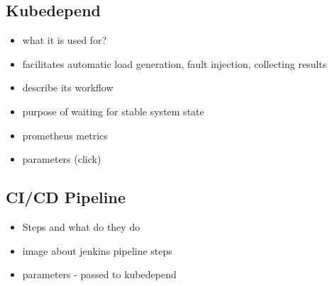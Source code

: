 \subsection{Kubedepend}

\begin{itemize}
	\item what it is used for?
	\item facilitates automatic load generation, fault injection, collecting results
	\item describe its workflow
	\item purpose of waiting for stable system state
	\item prometheus metrics
	\item parameters (click)
\end{itemize}

\subsection{CI/CD Pipeline} \label{cicd}

\begin{itemize}
	\item Steps and what do they do
	\item image about jenkins pipeline steps
	\item parameters - passed to kubedepend
\end{itemize}